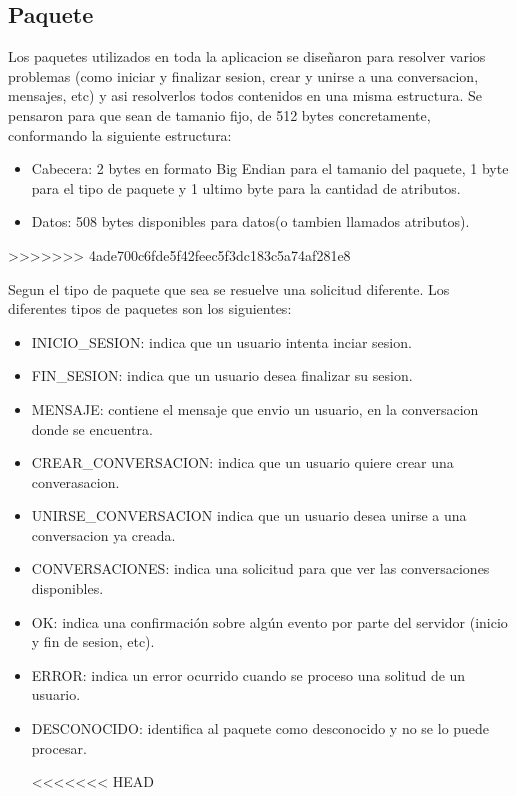 \documentclass[a4paper,12pt,titlepage]{article}
\begin{document}
\subsection{Paquete}

Los paquetes utilizados en toda la aplicacion se diseñaron para resolver varios problemas (como iniciar y finalizar sesion, crear y unirse a una conversacion, mensajes, etc) y asi resolverlos todos contenidos en una misma estructura.
Se pensaron para que sean de tamanio fijo, de 512 bytes concretamente, conformando la siguiente estructura:

\begin{itemize}
\item Cabecera: 2 bytes en formato Big Endian para el tamanio del paquete, 1 byte para el tipo de paquete y 1 ultimo byte para la cantidad de atributos.
\item Datos: 508 bytes disponibles para datos(o tambien llamados atributos).\\
\end{itemize}
>>>>>>> 4ade700c6fde5f42feec5f3dc183c5a74af281e8

Segun el tipo de paquete que sea se resuelve una solicitud diferente. Los diferentes tipos de paquetes son los siguientes:
\begin{itemize}
\item INICIO\_SESION: indica que un usuario intenta inciar sesion.
\item FIN\_SESION: indica que un usuario desea finalizar su sesion.
\item MENSAJE: contiene el mensaje que envio un usuario, en la conversacion donde se encuentra.
\item CREAR\_CONVERSACION: indica que un usuario quiere crear una converasacion.
\item UNIRSE\_CONVERSACION indica que un usuario desea unirse a una conversacion ya creada.
\item CONVERSACIONES: indica una solicitud para que ver las conversaciones disponibles.
\item OK: indica una confirmación sobre algún evento por parte del servidor (inicio y fin de sesion, etc).
\item ERROR: indica un error ocurrido cuando se proceso una solitud de un usuario.
\item DESCONOCIDO: identifica al paquete como desconocido y no se lo puede procesar.

<<<<<<< HEAD
\end{itemize}\\
\end{document}
